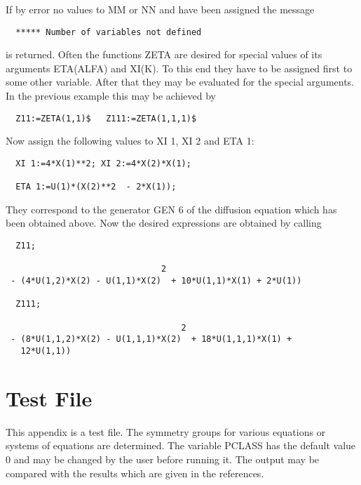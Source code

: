 If by error no values to MM or NN and have been assigned the message

\begin{verbatim}
  ***** Number of variables not defined
\end{verbatim}

is returned. Often the functions ZETA are desired for special values
of its arguments ETA(ALFA) and XI(K). To this end they have to be
assigned first to some other variable. After that they may be
evaluated for the special arguments. In the previous example this may
be achieved by

\begin{verbatim}
  Z11:=ZETA(1,1)$   Z111:=ZETA(1,1,1)$
\end{verbatim}

Now assign the following values to XI 1, XI 2 and ETA 1:

\begin{verbatim}
  XI 1:=4*X(1)**2; XI 2:=4*X(2)*X(1);

  ETA 1:=U(1)*(X(2)**2  - 2*X(1));
\end{verbatim}

They correspond to the generator GEN 6 of the diffusion equation which
has been obtained above. Now the desired expressions are obtained by
calling

\begin{verbatim}
  Z11;

                               2
 - (4*U(1,2)*X(2) - U(1,1)*X(2)  + 10*U(1,1)*X(1) + 2*U(1))

  Z111;

                                   2
 - (8*U(1,1,2)*X(2) - U(1,1,1)*X(2)  + 18*U(1,1,1)*X(1) +
   12*U(1,1))
\end{verbatim}


\section{Test File}

This appendix is a test file. The symmetry groups for various
equations or systems of equations are determined. The variable PCLASS
has the default value 0 and may be changed by the user before running
it. The output may be compared with the results which are given in the
references.

